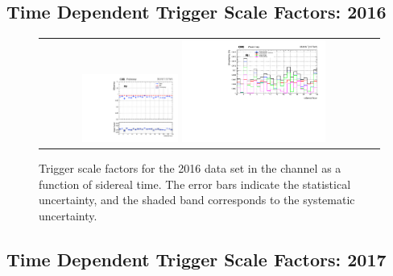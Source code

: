 \subsection{Time Dependent Trigger Scale Factors: 2016}
\label{TrigSFResults_SideReal_2016}

\begin{figure}[!htb]
  \begin{center}
    \begin{tabular}{cc}
      \includegraphics[width=0.30\textwidth]{fig_2016_sidereal/g_emu_sidereel_FullSystUncBand.pdf}
      \includegraphics[width=0.45\textwidth]{fig_2016_sidereal/g_emu_sidereel_ErrorsBreakdown.pdf}\\
    \end{tabular}
    \caption{Trigger scale factors for the 2016 data set in the \emu channel as a function of sidereal time.
            The error bars indicate the statistical uncertainty, and the shaded band corresponds to the systematic uncertainty.
            }
    \label{TrigSF_SideReal_2016_1}
  \end{center}
\end{figure}

\subsection{Time Dependent Trigger Scale Factors: 2017}
\label{TrigSFResults_SideReal_2017}

